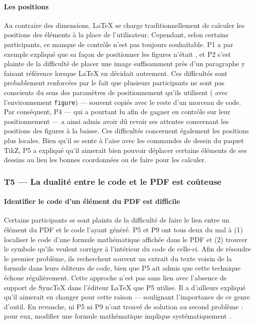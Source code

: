 \paragraph{Les positions}
Au contraire des dimensions, \LaTeX{} se charge traditionnellement de calculer les positions des éléments à la place de l'utilisateur.
Cependant, selon certains participants, ce manque de contrôle n'est pas toujours souhaitable.
P1 a par exemple expliqué que sa façon de positionner les figures n'était , et P2 s'est plainte de la difficulté de placer une image suffisamment près d'un paragraphe y faisant référence lorsque \LaTeX{} en décidait autrement.
Ces difficultés sont probablement renforcées par le fait que plusieurs participants ne sont pas conscients du sens des paramètres de positionnement qu'ils utilisent (\eg{} avec l'environnement \texttt{figure}) --- souvent copiés avec le reste d'un morceau de code.
Par conséquent, P4 --- qui a pourtant lu  afin de gagner en contrôle sur leur positionnement --- a ainsi admis avoir dû revoir ses attentes concernant les positions des figures à la baisse.
Ces difficultés concernent également les positions plus locales.
Bien qu'il se sente à l'aise avec les commandes de dessin du paquet TikZ, P5 a expliqué qu'il aimerait bien pouvoir déplacer certains éléments de ses dessins au lieu  les bonnes coordonnées ou de faire  pour les calculer.



\subsubsection{T5 --- La dualité entre le code et le PDF est coûteuse}

\paragraph{Identifier le code d'un élément du PDF est difficile}
Certains participants se sont plaints de la difficulté de faire le lien entre un élément du PDF et le code l'ayant généré.
P5 et P9 ont tous deux du mal à (1) localiser le code d'une formule mathématique affichée dans le PDF et (2) trouver le symbole qu'ils veulent corriger à l'intérieur du code de celle-ci.
Afin de résoudre le premier problème, ils recherchent souvent un extrait du texte voisin de la formule dans leurs éditeurs de code, bien que P5 ait admis que cette technique échoue régulièrement.
Cette approche n'est pas sans lien avec l'absence de support de SyncTeX dans l'éditeur \LaTeX{} que P5 utilise.
Il a d'ailleurs expliqué qu'il aimerait en changer pour cette raison --- soulignant l'importance de ce genre d'outil.
En revanche, ni P5 ni P9 n'ont trouvé de solution au second problème : pour eux, modifier une formule mathématique implique systématiquement .

